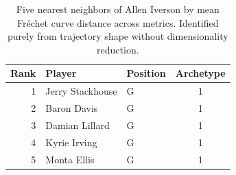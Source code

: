 \begin{table}[htbp]
  \centering\small
  \begin{tabular}{rllc}
    \toprule
    Rank & Player & Position & Archetype \\
    \midrule
    1 & Jerry Stackhouse & G & 1 \\
    2 & Baron Davis & G & 1 \\
    3 & Damian Lillard & G & 1 \\
    4 & Kyrie Irving & G & 1 \\
    5 & Monta Ellis & G & 1 \\
    \bottomrule
  \end{tabular}
  \caption{Five nearest neighbors of Allen Iverson by mean Fr\'{e}chet curve distance across metrics. Identified purely from trajectory shape without dimensionality reduction.}
  \label{tab:Allen_Iverson_frechet_curve_neighbors}
\end{table}

